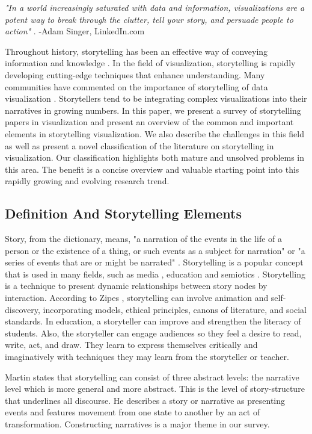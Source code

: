 \documentclass{egpubl}
\begin{document}
\textit{"In a world increasingly saturated with data and information, visualizations are a potent way to break through the clutter, tell your story, and persuade people to action"} \cite{adam2015}. -Adam Singer, LinkedIn.com

Throughout history, storytelling has been an effective way of conveying information and knowledge \cite{Lidal2013}. In the field of visualization, storytelling is rapidly developing cutting-edge techniques that enhance understanding. Many communities have commented on the importance of storytelling of data visualization \cite{segal}. Storytellers tend to be integrating complex visualizations into their narratives in growing numbers. In this paper, we present a survey of storytelling papers in visualization and present an overview of the common and important elements in storytelling visualization. We also describe the challenges in this field as well as present a novel classification of the literature on storytelling in visualization. Our classification highlights both mature and unsolved problems in this area. The benefit is a concise overview and valuable starting point into this rapidly growing and evolving research trend. 

\subsection{Definition And Storytelling Elements}
Story, from the dictionary, means, "a narration of the events in the life of a person or the existence of a thing, or such events as a subject for narration" \cite{story1} or "a series of events that are or might be narrated" \cite{story2}. Storytelling is a popular concept that is used in many fields, such as media \cite{segal}, education \cite{Jack1995} and semiotics \cite{Martin1997}.
Storytelling is a technique to present dynamic relationships between story nodes by interaction.
According to Zipes \cite{Jack1995}, storytelling can involve animation and self-discovery, incorporating models, ethical principles, canons of literature, and social standards. In education, a storyteller can improve and strengthen the literacy of students. Also, the storyteller can engage audiences so they feel a desire to read, write, act, and draw. They learn to express themselves critically and imaginatively with techniques they may learn from the storyteller or teacher.

Martin\cite{Martin1997} states that storytelling can consist of three abstract levels: the narrative level which is more general and more abstract. This is the level of story-structure that underlines all discourse. He describes a story or narrative as presenting events and features movement from one state to another by an act of transformation. Constructing narratives is a major theme in our survey.
\end{document}
